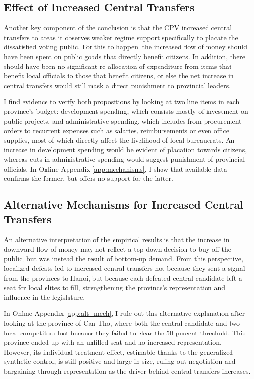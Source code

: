 \documentclass[12pt]{article}
\newcommand{\1}{\mathbbm{1}}
\begin{document}
\subsection*{Effect of Increased Central Transfers}

Another key component of the conclusion is that the CPV increased central transfers to areas it observes weaker regime support specifically to placate the dissatisfied voting public. For this to happen, the increased flow of money should have been spent on public goods that directly benefit citizens. In addition, there should have been no significant re-allocation of expenditure from items that benefit local officials to those that benefit citizens, or else the net increase in central transfers would still mask a direct punishment to provincial leaders. 

I find evidence to verify both propositions by looking at two line items in each province's budget: development spending, which consists mostly of investment on public projects, and administrative spending, which includes from procurement orders to recurrent expenses such as salaries, reimbursements or even office supplies, most of which directly affect the livelihood of local bureaucrats. An increase in development spending would be evident of placation towards citizens, whereas cuts in administrative spending would suggest punishment of provincial officials. In Online Appendix \ref{app:mechanisms}, I show that available data confirms the former, but offers no support for the latter.

\subsection*{Alternative Mechanisms for Increased Central Transfers}

An alternative interpretation of the empirical results is that the increase in downward flow of money may not reflect a top-down decision to buy off the public, but was instead the result of bottom-up demand. From this perspective, localized defeats led to increased central transfers not because they sent a signal from the provinces to Hanoi, but because each defeated central candidate left a seat for local elites to fill, strengthening the province's representation and influence in the legislature. 

In Online Appendix \ref{app:alt_mech}, I rule out this alternative explanation after looking at the province of Can Tho, where both the central candidate and two local competitors lost because they failed to clear the 50 percent threshold. This province ended up with an unfilled seat and no increased representation. However, its individual treatment effect, estimable thanks to the generalized synthetic control, is still positive and large in size, ruling out negotiation and bargaining through representation as the driver behind central transfers increases.
\end{document}
